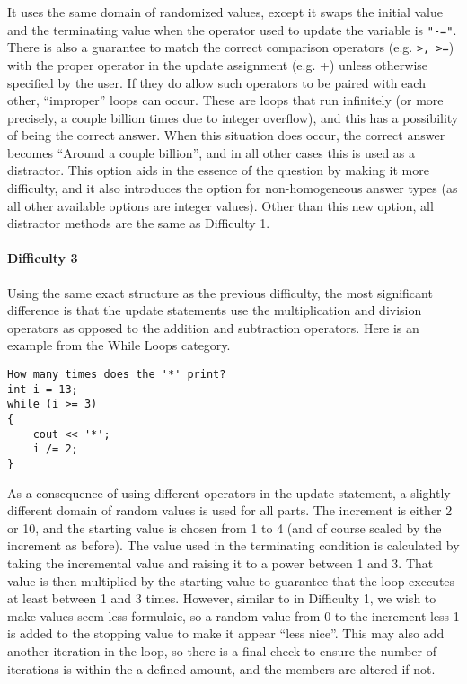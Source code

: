 \documentclass{article}
\begin{document}
 It uses the same domain of randomized values, except it swaps the initial value and the terminating value when the operator used to update the variable is \verb;"-=";. There is also a 
guarantee to match the correct comparison operators (e.g. \verb;>, >=;) with the proper operator in the update assignment (e.g. +) unless otherwise specified by the user.
If they do allow such operators to be paired with each other, ``improper'' loops can occur. These are loops that run infinitely (or more precisely, a couple billion times due to integer overflow), 
and this has a possibility of being the correct answer. When this situation does occur, the correct answer becomes ``Around a couple billion'', and in all other cases this is used as a distractor. This 
option aids in the essence of the question by making it more difficulty, and it also introduces the option for non-homogeneous answer types (as all other available options are integer values). 
Other than this new option, all distractor methods are the same as Difficulty 1.

\paragraph{Difficulty 3} \hfill \par
Using the same exact structure as the previous difficulty, the most significant difference is that the update statements use the multiplication and division operators as opposed to the addition
and subtraction operators. Here is an example from the While Loops category.

\begin{lstlisting}
How many times does the '*' print?
int i = 13; 
while (i >= 3) 
{
	cout << '*'; 
	i /= 2;
}
\end{lstlisting}

As a consequence of using different operators in the update statement, a slightly different domain of random values is used for all parts. The increment is either 2 or 10, and the starting value 
is chosen from 1 to 4 (and of course scaled by the increment as before). The value used in the terminating condition is calculated by taking the incremental value and raising it to a power 
between 1 and 3. That value is then multiplied by the starting value to guarantee that the loop executes at least between 1 and 3 times. However, similar to in Difficulty 1, we wish to make
values seem less formulaic, so a random value from 0 to the increment less 1 is added to the stopping value to make it appear ``less nice''. This may also add another iteration in the loop,
so there is a final check to ensure the number of iterations is within the a defined amount, and the members are altered if not. 
\end{document}
